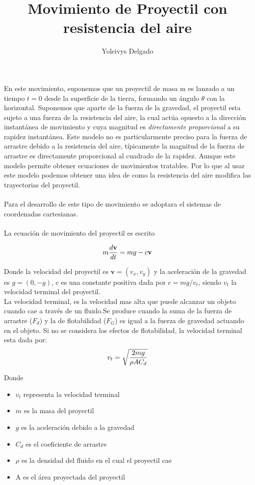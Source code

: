 \documentclass[12pt,a4paper,twoside]{article}
\author{Yoleivys Delgado}
\title{\textbf{Movimiento de Proyectil con resistencia del aire}}
\begin{document}
\maketitle

En este movimiento, suponemos que un proyectil de masa m es lanzado a un tiempo $t=0$ desde la superficie de la tierra, formando un ángulo $\theta$ con la horizontal. Suponemos que  aparte de la fuerza de la gravedad, el proyectil esta sujeto a una fuerza de la resistencia del aire, la cual actúa opuesto a la dirección instantánea de movimiento y cuya magnitud es \textit{directamente proporcional} a su rapidez instantánea. Este modelo no es particularmente preciso para la fuerza de arrastre debido a la resistencia del aire, típicamente la magnitud de la fuerza de arrastre es directamente proporcional al cuadrado de la rapidez. Aunque este modelo permite obtener ecuaciones de movimientos tratables. Por lo que al usar este modelo podemos obtener una idea de como la resistencia del aire modifica las trayectorias del proyectil.\\ \\
Para el desarrollo de este tipo de movimiento se adoptara el sistemas de coordenadas cartesianas.\\ \\
La ecuación de movimiento del proyectil es escrito 

\begin{equation}
\centering
m\frac{d\textbf{v}}{dt} = mg -c\textbf{v}
\end{equation}

Donde la velocidad del proyectil es $\textbf{v}=(v_{x},v_{y})$ y la aceleración de la gravedad es $g=(0,-g)$, c es una constante positiva dada por $c=mg/v_{t}$, siendo $v_{t}$  la velocidad terminal del proyectil.\\
La velocidad terminal, es la velocidad mas alta que puede alcanzar un objeto cuando cae a través de un fluido.Se produce cuando la suma de la fuerza de arrastre ($F_{d}$) y la de flotabilidad ($F_{G}$) es igual a la fuerza de gravedad actuando en el objeto. Si no se considera los efectos de flotabilidad, la velocidad terminal esta dada por: 
\begin{equation}
\centering 
v_{t}= \sqrt{\frac{2mg}{\rho AC_{d}}}
\end{equation}

Donde 
\begin{itemize}
\item $v_{t}$ representa la velocidad terminal
\item $m$ es la masa del proyectil
\item $g$ es la aceleración debido a la gravedad
\item $C_{d}$ es el coeficiente de arrastre 
\item $\rho$  es la densidad del fluido en el cual el proyectil cae
\item A es el área proyectada del proyectil
\end{itemize}
\end{document}
